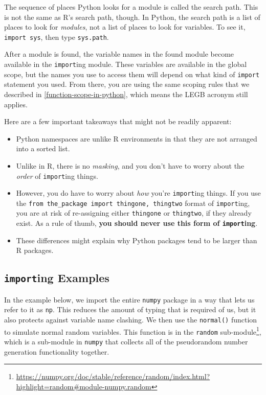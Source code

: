 \documentclass[
  12pt,
]{krantz}
\renewcommand{\href}[2]{#2\footnote{\url{#1}}}
\begin{document}
The sequence of places Python looks for a module is called the search path. This is not the same as R's search path, though. In Python, the search path is a list of places to look for \emph{modules}, not a list of places to look for variables. To see it, \texttt{import\ sys}, then type \texttt{sys.path}.

After a module is found, the variable names in the found module become available in the \texttt{import}ing module. These variables are available in the global scope, but the names you use to access them will depend on what kind of \texttt{import} statement you used. From there, you are using the same scoping rules that we described in \ref{function-scope-in-python}, which means the LEGB acronym still applies.

Here are a few important takeaways that might not be readily apparent:

\begin{itemize}
\item
  Python namespaces are unlike R environments in that they are not arranged into a sorted list.
\item
  Unlike in R, there is no \emph{masking}, and you don't have to worry about the \emph{order} of \texttt{import}ing things.
\item
  However, you do have to worry about \emph{how} you're \texttt{import}ing things. If you use the \texttt{from\ the\_package\ import\ thingone,\ thingtwo} format of \texttt{import}ing, you are at risk of re-assigning either \texttt{thingone} or \texttt{thingtwo}, if they already exist. As a rule of thumb, \textbf{you should never use this form of \texttt{import}ing}.
\item
  These differences might explain why Python packages tend to be larger than R packages.
\end{itemize}

\hypertarget{importing-examples}{%
\subsection{\texorpdfstring{\texttt{import}ing Examples}{importing Examples}}\label{importing-examples}}

In the example below, we import the entire \texttt{numpy} package in a way that lets us refer to it as \texttt{np}. This reduces the amount of typing that is required of us, but it also protects against variable name clashing. We then use the \texttt{normal()} function to simulate normal random variables. This function is in the \href{https://numpy.org/doc/stable/reference/random/index.html?highlight=random\#module-numpy.random}{\texttt{random} sub-module}, which is a sub-module in \texttt{numpy} that collects all of the pseudorandom number generation functionality together.
\end{document}
